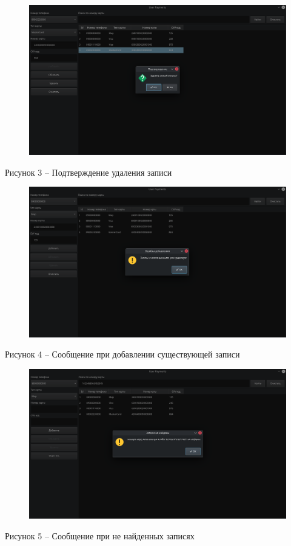 \documentclass[a4paper,14pt]{extarticle}
\begin{document}
  \begin{figure}[h]
    \centering
    \includegraphics[width=0.95\linewidth]{img/f-2}
  \end{figure}
  \begin{center}
    Рисунок 3 – Подтверждение удаления записи
  \end{center}

  \pagebreak
  \begin{figure}[h]
    \centering
    \includegraphics[width=0.95\linewidth]{img/f-3}
  \end{figure}
  \begin{center}
    Рисунок 4 – Сообщение при добавлении существующей записи
  \end{center}

  \begin{figure}[h]
    \centering
    \includegraphics[width=0.95\linewidth]{img/f-4}
  \end{figure}
  \begin{center}
    Рисунок 5 – Сообщение при не найденных записях
  \end{center}
\end{document}
